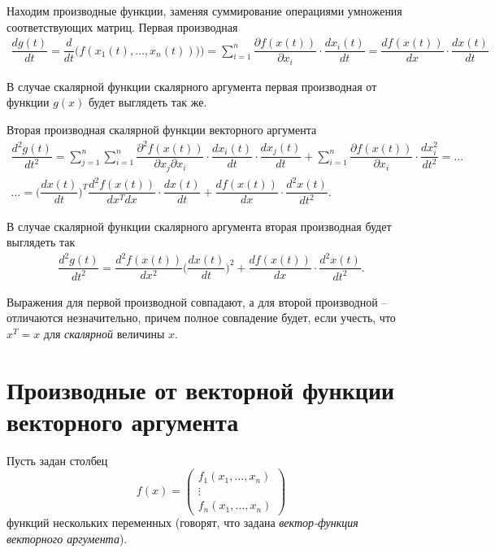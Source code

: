 \documentclass[%
	11pt,
	a4paper,
	utf8,
		]{article}
\begin{document}
Находим производные функции, заменяя суммирование операциями умножения соответствующих матриц. Первая производная
\begin{align*}
	\dfrac{ d g(t) }{ dt } = \dfrac{d}{dt} \Big( f(x_1(t), \ldots, x_n(t))) \Big) = \sum_{i=1}^{n} \dfrac{\partial f(x(t))}{\partial x_i} \cdot \dfrac{ d x_i(t) }{dt} = \dfrac{df(x(t))}{dx} \cdot \dfrac{dx(t)}{dt}
\end{align*}

В случае скалярной функции скалярного аргумента первая производная от функции $ g(x) $ будет выглядеть так же.

Вторая производная скалярной функции векторного аргумента
\begin{multline*}
  \dfrac{d^2 g(t)}{dt^2} = \sum_{j=1}^{n} \sum_{i=1}^{n} \dfrac{ \partial^2 f(x(t)) }{ \partial x_j \partial x_i } \cdot \dfrac{ d x_i(t) }{ dt } \cdot \dfrac{ d x_j(t) }{dt} + \sum_{i=1}^n \dfrac{ \partial f(x(t)) }{\partial x_i} \cdot \dfrac{d x_i^2}{d t^2} = \ldots \\
  \ldots = \Big( \dfrac{d x(t)}{dt} \Big)^T \dfrac{ d^2 f(x(t)) }{ dx^T dx } \cdot \dfrac{dx(t)}{dt} + \dfrac{df(x(t))}{dx} \cdot \dfrac{d^2 x(t)}{dt^2}.
\end{multline*}

В случае скалярной функции скалярного аргумента вторая производная будет выглядеть так
\begin{align*}
  \dfrac{d^2 g(t)}{d t^2} = \dfrac{ d^2 f(x(t)) }{dx^2} \Big( \dfrac{dx(t)}{dt} \Big)^2 + \dfrac{ df(x(t)) }{dx} \cdot \dfrac{ d^2 x(t) }{dt^2}.
\end{align*}

Выражения для первой производной совпадают, а для второй производной -- отличаются незначительно, причем полное совпадение будет, если учесть, что $ x^T = x $ для \emph{скалярной} величины $ x $.

\section{Производные от векторной функции векторного аргумента}

Пусть задан столбец
$$
f(x) =
\begin{pmatrix}
	f_1(x_1, \ldots, x_n)\\
	\vdots \\
	f_n(x_1, \ldots, x_n)
\end{pmatrix}
$$
функций нескольких переменных (говорят, что задана \emph{вектор-функция векторного аргумента}).
\end{document}
